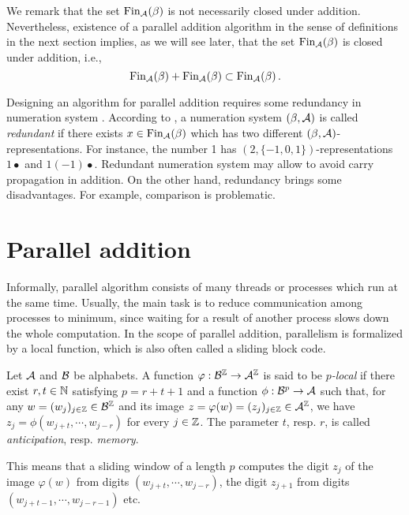  We remark that the set $\text{Fin}_{\mathcal{A}}(\beta)$ is not necessarily closed under addition. Nevertheless, existence of a parallel addition algorithm in the sense of definitions in the next section implies, as we will see later, that the set $\text{Fin}_{\mathcal{A}}(\beta)$ is closed under addition, i.e.,
$$
\text{Fin}_{\mathcal{A}}(\beta) + \text{Fin}_{\mathcal{A}}(\beta) \subset \text{Fin}_{\mathcal{A}}(\beta)\,.
$$ 

Designing an algorithm for parallel addition requires some redundancy in numeration system \cite{kornerup}. According to \cite{redundant}, a numeration system $(\beta,\mathcal{A})$ is called \emph{redundant} if there exists $x \in \text{Fin}_{\mathcal{A}}(\beta)$ which has two different $(\beta,\mathcal{A})$-representations. For instance, the number 1 has $(2,\{-1,0,1\})$-representations $1\bullet$ and $1(-1)\bullet$.
Redundant numeration system may allow to avoid carry propagation in addition. On the other hand, redundancy brings some disadvantages. For example, comparison is problematic.  


\section{Parallel addition}
Informally, parallel algorithm consists of many threads or processes which run at the same time. Usually, the main task is to reduce communication among processes to minimum, since waiting for a result of another process slows down the whole computation. In the scope of parallel addition, parallelism is formalized by a  local function, which is also often called a sliding block code.

\begin{defn}
Let $\mathcal{A}$ and $\mathcal{B}$ be alphabets. A function $\varphi:\mathcal{B}^{\mathbb{Z}} \rightarrow \mathcal{A}^{\mathbb{Z}}$ is said to be \emph{$p$-local} if there exist $r,t\in\mathbb{N}$ satisfying $p=r+t+1$ and a function $\phi: \mathcal{B}^p \rightarrow \mathcal{A}$ such that, for any $w=(w_j)_{j\in\mathbb{Z}}\in\mathcal{B}^{\mathbb{Z}}$ and its image $z=\varphi(w)=(z_j)_{j\in\mathbb{Z}}\in\mathcal{A}^{\mathbb{Z}}$, we have $z_j=\phi(w_{j+t},\cdots,w_{j-r})$ for every $j\in\mathbb{Z}$. The parameter $t$, resp. $r$, is called \emph{anticipation}, resp. \emph{memory}.
\end{defn}
This means that a sliding window of a length $p$ computes the digit $z_j$ of the image $\varphi(w)$ from digits $(w_{j+t},\cdots,w_{j-r})$, the digit $z_{j+1}$ from digits $(w_{j+t-1},\cdots,w_{j-r-1})$ etc.
  
